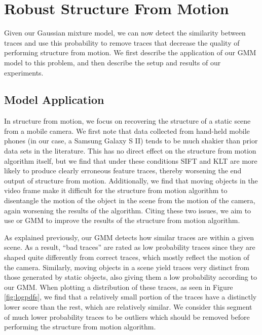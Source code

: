 \section{Robust Structure From Motion}
\label{sec:sfm}

Given our Gaussian mixture model, we can now detect the similarity between
traces and use this probability to remove traces that decrease the quality of
performing structure from motion.  We first describe the application of our GMM
model to this problem, and then describe the setup and results of our
experiments.

\subsection{Model Application} %
\label{sub:Model Application}

In structure from motion, we focus on recovering the structure of a
static scene from a mobile camera.  We first note that data
collected from hand-held mobile phones (in our case, a Samsung Galaxy S II)
tends to be much shakier than prior data sets in the literature.  
This has no direct effect on the structure from motion algorithm itself, but we find that 
under these conditions SIFT and KLT are more likely to produce clearly erroneous feature traces,
thereby worsening the end output of structure from motion.  Additionally, we find
that moving objects in the video frame make it difficult for
the structure from motion algorithm to disentangle the motion of the object in
the scene from the motion of the camera, again worsening the results of the
algorithm.  Citing these two issues, we aim to use or
GMM to improve the results of the structure from motion algorithm.

As explained previously, our GMM detects how similar traces are within a given
scene.  As a result, ``bad traces'' are rated as low probability traces since they 
are shaped quite differently from correct traces, which mostly reflect the motion of 
the camera.  Similarly, moving objects in a scene yield traces very distinct from 
those generated by static objects, also giving them a low probability according to our GMM.  When plotting a
distribution of these traces, as seen in Figure \ref{fig:logpdfs}, we find that
a relatively small portion of the traces have a distinctly lower score than
the rest, which are relatively similar.  We consider this
segment of much lower probability traces to be outliers which should be
removed before performing the structure from motion algorithm.

